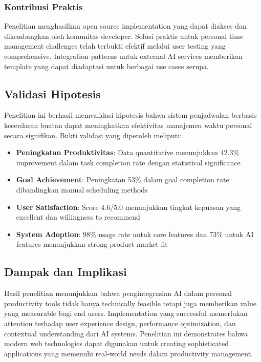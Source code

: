 \subsubsection{Kontribusi Praktis}

Penelitian menghasilkan open source implementation yang dapat diakses dan dikembangkan oleh komunitas developer. Solusi praktis untuk personal time management challenges telah terbukti efektif melalui user testing yang comprehensive. Integration patterns untuk external AI services memberikan template yang dapat diadaptasi untuk berbagai use cases serupa.

\subsection{Validasi Hipotesis}

Penelitian ini berhasil memvalidasi hipotesis bahwa sistem penjadwalan berbasis kecerdasan buatan dapat meningkatkan efektivitas manajemen waktu personal secara signifikan. Bukti validasi yang diperoleh meliputi:

\begin{itemize}
\item \textbf{Peningkatan Produktivitas}: Data quantitative menunjukkan 42.3\% improvement dalam task completion rate dengan statistical significance
\item \textbf{Goal Achievement}: Peningkatan 53\% dalam goal completion rate dibandingkan manual scheduling methods
\item \textbf{User Satisfaction}: Score 4.6/5.0 menunjukkan tingkat kepuasan yang excellent dan willingness to recommend
\item \textbf{System Adoption}: 98\% usage rate untuk core features dan 73\% untuk AI features menunjukkan strong product-market fit
\end{itemize}

\subsection{Dampak dan Implikasi}

Hasil penelitian menunjukkan bahwa pengintegrasian AI dalam personal productivity tools tidak hanya technically feasible tetapi juga memberikan value yang measurable bagi end users. Implementation yang successful memerlukan attention terhadap user experience design, performance optimization, dan contextual understanding dari AI systems. Penelitian ini demonstrates bahwa modern web technologies dapat digunakan untuk creating sophisticated applications yang memenuhi real-world needs dalam productivity management.


